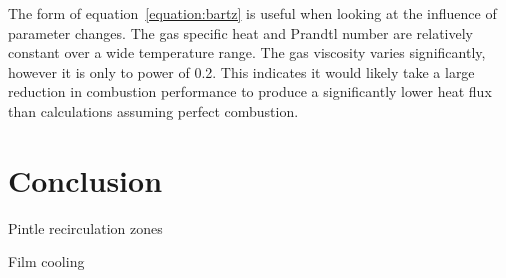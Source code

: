 \documentclass[11pt]{article}
\begin{document}
The form of equation~\ref{equation:bartz} is useful when looking at the influence of parameter changes. The gas specific heat and Prandtl number are relatively constant over a wide temperature range. The gas viscosity varies significantly, however it is only to power of 0.2. This indicates it would likely take a large reduction in combustion performance to produce a significantly lower heat flux than calculations assuming perfect combustion.

\section{Conclusion}

Pintle recirculation zones

Film cooling

\printbibliography
\end{document}
